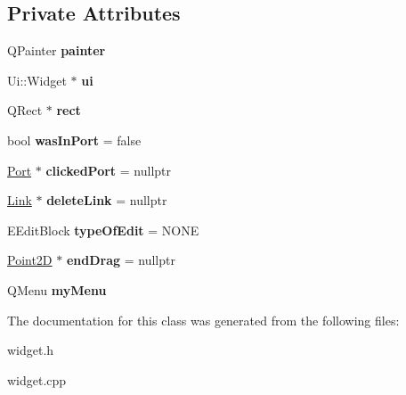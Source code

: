 \subsection*{Private Attributes}
\begin{DoxyCompactItemize}
\item 
\mbox{\label{classWidget_af0e5f7d75f5c030cda9abc2c04155cb7}} 
Q\+Painter {\bfseries painter}
\item 
\mbox{\label{classWidget_a19c48cc897c43aa2e995fce9f7fb2418}} 
Ui\+::\+Widget $\ast$ {\bfseries ui}
\item 
\mbox{\label{classWidget_a6122c1dcaeb90b6d84c1ed8dc3f0a60a}} 
Q\+Rect $\ast$ {\bfseries rect}
\item 
\mbox{\label{classWidget_a110805b026dce7cb7a0ceaac58bc46e9}} 
bool {\bfseries was\+In\+Port} = false
\item 
\mbox{\label{classWidget_ad933df66c50281f1cae0d1f834ca5c82}} 
\hyperlink{classPort}{Port} $\ast$ {\bfseries clicked\+Port} = nullptr
\item 
\mbox{\label{classWidget_a5d74de276b9c26599037abfd60beb801}} 
\hyperlink{classLink}{Link} $\ast$ {\bfseries delete\+Link} = nullptr
\item 
\mbox{\label{classWidget_a7d1e214005f1062688dcde868a6d40d1}} 
E\+Edit\+Block {\bfseries type\+Of\+Edit} = N\+O\+NE
\item 
\mbox{\label{classWidget_a16ab9de873a36b0e0d11c19ec1f3eb45}} 
\hyperlink{classPoint2D}{Point2D} $\ast$ {\bfseries end\+Drag} = nullptr
\item 
\mbox{\label{classWidget_a4fc5106cbb60fdcb49f5d003c3ed2f40}} 
Q\+Menu {\bfseries my\+Menu}
\end{DoxyCompactItemize}


The documentation for this class was generated from the following files\+:\begin{DoxyCompactItemize}
\item 
widget.\+h\item 
widget.\+cpp\end{DoxyCompactItemize}
